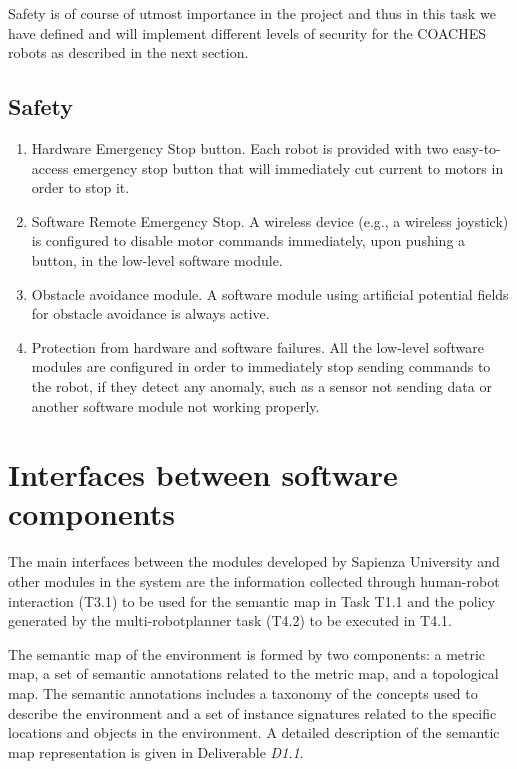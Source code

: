 \documentclass{article}
\begin{document}
Safety is of course of utmost importance in the project and thus in this task we have defined and will implement different levels of security for the COACHES robots as described in the next section.


\subsection{Safety}


\begin{enumerate}
\item Hardware Emergency Stop button. Each robot is provided with two easy-to-access emergency stop button that will immediately cut current to motors in order to stop it.
\item Software Remote Emergency Stop. A wireless device (e.g., a wireless joystick) is configured to disable motor commands immediately, upon pushing a button, in the low-level software module.
\item Obstacle avoidance module. A software module using artificial potential fields for obstacle avoidance is always active.
\item Protection from hardware and software failures. All the low-level software modules are configured in order to immediately stop sending commands to the robot, if they detect any anomaly, such as a sensor not sending data or another software module not working properly. 
\end{enumerate}


\section{Interfaces between software components}

The main interfaces between the modules developed by Sapienza University and other modules in the system are the information collected through human-robot interaction (T3.1) to be used for the semantic map in Task T1.1 and the policy generated by the multi-robotplanner task (T4.2) to be executed in T4.1.

The semantic map of the environment is formed by two components: a metric map, a set of semantic annotations related to the metric map, and a topological map. The semantic annotations includes a taxonomy of the concepts used to describe the environment and a set of instance signatures related to the specific locations and objects in the environment.
A detailed description of the semantic map representation is given in Deliverable \emph{D1.1}.
\end{document}
